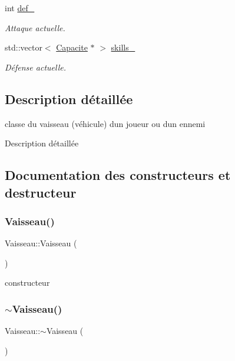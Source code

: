 \begin{DoxyCompactItemize}
int \hyperlink{class_vaisseau_abe1d646c91dcd6ad2d84a5d30ea2aeca}{def\+\_\+}
\begin{DoxyCompactList}\small\item\em Attaque actuelle. \end{DoxyCompactList}\item 
std\+::vector$<$ \hyperlink{class_capacite}{Capacite} $\ast$ $>$ \hyperlink{class_vaisseau_a7fccd409e1f27f968bbe3f8ee1ded206}{skills\+\_\+}
\begin{DoxyCompactList}\small\item\em Défense actuelle. \end{DoxyCompactList}\end{DoxyCompactItemize}


\subsection{Description détaillée}
classe du vaisseau (véhicule) d\textquotesingle{}un joueur ou d\textquotesingle{}un ennemi 

Description détaillée 

\subsection{Documentation des constructeurs et destructeur}
\mbox{\label{class_vaisseau_a86378a70f0d92fcc6c5c5973574b2b7d}} 
\subsubsection{\texorpdfstring{Vaisseau()}{Vaisseau()}}
{\footnotesize\ttfamily Vaisseau\+::\+Vaisseau (\begin{DoxyParamCaption}{ }\end{DoxyParamCaption})\hspace{0.3cm}{\ttfamily [explicit]}}



constructeur 

\mbox{\label{class_vaisseau_a3360bd62af7a7aaf5732b86d639a0674}} 
\subsubsection{\texorpdfstring{$\sim$\+Vaisseau()}{~Vaisseau()}}
{\footnotesize\ttfamily Vaisseau\+::$\sim$\+Vaisseau (\begin{DoxyParamCaption}{ }\end{DoxyParamCaption})\hspace{0.3cm}{\ttfamily [override]}}



